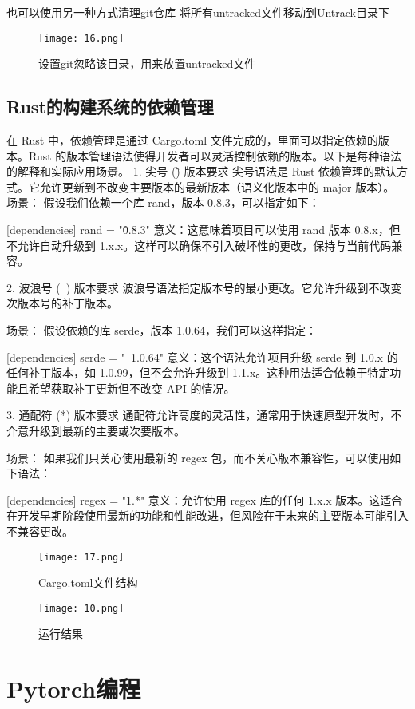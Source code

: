\documentclass[a4paper, 12pt]{article}
\begin{document}
也可以使用另一种方式清理git仓库
将所有untracked文件移动到Untrack目录下
\begin{figure}[H]
  \centering
\texttt{[image: 16.png]}
  \caption{设置git忽略该目录，用来放置untracked文件}
   \end{figure}

   
\subsection{Rust的构建系统的依赖管理}  
在 Rust 中，依赖管理是通过 Cargo.toml 文件完成的，里面可以指定依赖的版本。Rust 的版本管理语法使得开发者可以灵活控制依赖的版本。以下是每种语法的解释和实际应用场景。
1. 尖号 (\^) 版本要求
尖号语法是 Rust 依赖管理的默认方式。它允许更新到不改变主要版本的最新版本（语义化版本中的 major 版本）。
场景：
假设我们依赖一个库 rand，版本 0.8.3，可以指定如下：

[dependencies]
rand = "\^0.8.3"
意义：这意味着项目可以使用 rand 版本 0.8.x，但不允许自动升级到 1.x.x。这样可以确保不引入破坏性的更改，保持与当前代码兼容。

2. 波浪号 (~) 版本要求
波浪号语法指定版本号的最小更改。它允许升级到不改变次版本号的补丁版本。

场景：
假设依赖的库 serde，版本 1.0.64，我们可以这样指定：

[dependencies]
serde = "~1.0.64"
意义：这个语法允许项目升级 serde 到 1.0.x 的任何补丁版本，如 1.0.99，但不会允许升级到 1.1.x。这种用法适合依赖于特定功能且希望获取补丁更新但不改变 API 的情况。

3. 通配符 (*) 版本要求
通配符允许高度的灵活性，通常用于快速原型开发时，不介意升级到最新的主要或次要版本。

场景：
如果我们只关心使用最新的 regex 包，而不关心版本兼容性，可以使用如下语法：

[dependencies]
regex = "1.*"
意义：允许使用 regex 库的任何 1.x.x 版本。这适合在开发早期阶段使用最新的功能和性能改进，但风险在于未来的主要版本可能引入不兼容更改。
\begin{figure}[H]
  \centering
    \texttt{[image: 17.png]}
  \caption{Cargo.toml文件结构}
   \end{figure}   

   \begin{figure}[H]
  \centering
    \texttt{[image: 10.png]}
  \caption{运行结果}
   \end{figure}   

\section{Pytorch编程}
\end{document}
